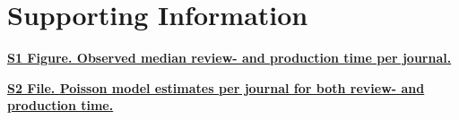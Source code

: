 \section*{Supporting Information}

\href{https://github.com/chartgerink/2015lag/raw/master/archive/S1Figure.pdf}{\textbf{S1 Figure. Observed median review- and production time per journal.}}

\href{https://github.com/chartgerink/2015lag/raw/master/archive/S2File.xlsx}{\textbf{S2 File. Poisson model estimates per journal for both review- and production time.}}


  
  
  